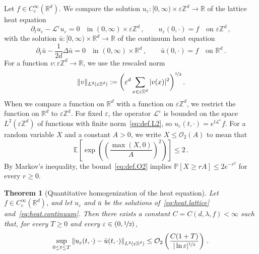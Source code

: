 \documentclass[11pt]{amsart}
\newtheorem{theorem}{Theorem}[section]
\numberwithin{equation}{section}
\newcommand{\Z}{\mathbb{Z}}
\newcommand{\R}{\mathbb{R}}
\newcommand{\E}{\mathbb{E}}
\newcommand{\PP}{\mathbb{P}}
\newcommand{\cO}{\mathcal{O}}
\newcommand{\eps}{\varepsilon}
\newcommand{\Leps}{\mathcal{L}^\varepsilon}
\newcommand{\nf}{\nicefrac}
\begin{document}
Let $f \in C^\infty_c(\R^d)$.
We compare the solution $u_\eps \colon [0, \infty) \times \eps \Z^d \to \R$ of the lattice heat equation
\begin{equation} \label{eq:heat.lattice}
    \partial_t u_\eps - \Leps u_\eps = 0 \quad \text{in } (0, \infty) \times \eps \Z^d\,, \qquad u_\eps(0, \cdot) = f \quad \text{on } \eps \Z^d\,,
\end{equation}
with the solution $\bar u \colon [0, \infty) \times \R^d \to \R$ of the continuum heat equation
\begin{equation} \label{eq:heat.continuum}
    \partial_t \bar u - \frac{1}{2d} \Delta \bar u = 0 \quad \text{in } (0, \infty) \times \R^d\,, \qquad \bar u(0, \cdot) = f \quad \text{on } \R^d\,.
\end{equation}
For a function $v \colon \eps \Z^d \to \R$, we use the rescaled norm
\begin{equation} \label{eq:def.L2}
    \| v \|_{L^2(\eps \Z^d)} := \biggl( \eps^d \sum_{x \in \eps \Z^d} |v(x)|^2 \biggr)^{\nf12}\,.
\end{equation}
When we compare a function on $\R^d$ with a function on $\eps \Z^d$, we restrict the function on $\R^d$ to $\eps \Z^d$.
For fixed $\eps$, the operator $\Leps$ is bounded on the space $L^2(\eps \Z^d)$ of functions with finite norm~\eqref{eq:def.L2}, so $u_\eps(t, \cdot) = e^{t \Leps} f$.
For a random variable $X$ and a constant $A > 0$, we write $X \leq \cO_2(A)$ to mean that
\begin{equation} \label{eq:def.O2}
    \E \left[ \exp \left( \left( \frac{\max(X, 0)}{A} \right)^2 \right) \right] \leq 2\,.
\end{equation}
By Markov's inequality, the bound~\eqref{eq:def.O2} implies $\PP[X \geq rA] \leq 2 e^{-r^2}$ for every $r \geq 0$.

\begin{theorem}[Quantitative homogenization of the heat equation] \label{thm:main}
Let $f \in C^\infty_c(\R^d)$, and let $u_\eps$ and $\bar u$ be the solutions of~\eqref{eq:heat.lattice} and~\eqref{eq:heat.continuum}.
Then there exists a constant $C = C(d, \lambda, f) < \infty$ such that, for every $T \geq 0$ and every $\eps \in (0, \nf12)$,
\begin{equation} \label{eq:main}
    \sup_{0 \leq t \leq T} \left\| u_\eps(t, \cdot) - \bar u(t, \cdot) \right\|_{L^2(\eps \Z^d)} \leq \cO_2 \left( \frac{C (1 + T)}{|\ln \eps|^{\nf12}} \right)\,.
\end{equation}
\end{theorem}
\end{document}
